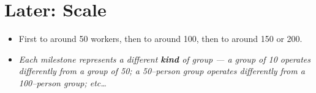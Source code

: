 \documentclass[11pt]{article}
\begin{document}
\section*{Later: Scale}
  \begin{itemize}
    \item First to around 50 workers, then to around 100, then to around 150 or 200.
    \item \textit{Each milestone represents a different \textbf{kind} of group --- a group of 10 operates differently from a group of 50; a 50--person group operates differently from a 100--person group; etc\dots}
  \end{itemize}

% 
% 
\end{document}
